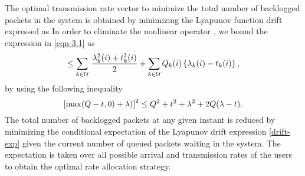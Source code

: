 The optimal transmission rate vector  to minimize the total number of backlogged packets in the system is obtained by minimizing the Lyapunov function drift expressed as
\iftoggle{single_column}{
\begin{multline}\label{eqn-3.1}
\mathrm{L}\sset{\mbf{Q}(i+1)} - \mathrm{L}\sset{\mbf{Q}(i)} = \frac{1}{2} \Big [ \sum_{k \in \mc{U}} \, \Big ( \left [ Q_k(i) - t_k(i) \right ]^+ + \lambda_k(i) \Big )^2 - Q^2_k(i) \Big ].
\end{multline}}{
\begin{multline}\label{eqn-3.1}
\mathrm{L}\sset{\mbf{Q}(i+1)} - \mathrm{L}\sset{\mbf{Q}(i)} = \\ \frac{1}{2} \Big [ \sum_{k \in \mc{U}} \, \Big ( \left [ Q_k(i) - t_k(i) \right ]^+ + \lambda_k(i) \Big )^2 - Q^2_k(i) \Big ].
\end{multline}}
In order to eliminate the nonlinear operator \me{[x]^+}, we bound the expression in \eqref{eqn-3.1} as
\begin{equation}
\leq \sum_{k \in \mc{U}} \, \frac{\lambda^2_k(i) + t_k^2(i)}{2} + \sum_{k \in \mc{U}} Q_k(i) \set{ \lambda_k(i) - t_k(i) },
\label{drift-exp}
\end{equation}
by using the following inequality 
\begin{equation}
\left [ \max(Q-t,0) + \lambda) \right ]^2 \leq Q^2 + t^2 + \lambda^2 + 2 Q (\lambda - t).
\end{equation}
The total number of backlogged packets at any given instant  is reduced by minimizing the conditional expectation of the Lyapunov drift expression \eqref{drift-exp} given the current number of queued packets  waiting in the system. The expectation is taken over all possible arrival and transmission rates of the users to obtain the optimal rate allocation strategy. 

